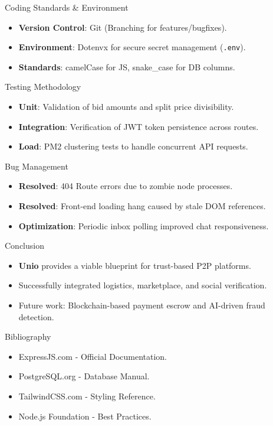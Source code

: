 \documentclass[10pt]{beamer}
\begin{document}
\begin{frame}{Coding Standards \& Environment}
    \begin{itemize}
        \item \textbf{Version Control}: Git (Branching for features/bugfixes).
        \item \textbf{Environment}: Dotenvx for secure secret management (\texttt{.env}).
        \item \textbf{Standards}: camelCase for JS, snake\_case for DB columns.
    \end{itemize}
\end{frame}

\begin{frame}{Testing Methodology}
    \begin{itemize}
        \item \textbf{Unit}: Validation of bid amounts and split price divisibility.
        \item \textbf{Integration}: Verification of JWT token persistence across routes.
        \item \textbf{Load}: PM2 clustering tests to handle concurrent API requests.
    \end{itemize}
\end{frame}

\begin{frame}{Bug Management}
    \begin{itemize}
        \item \textbf{Resolved}: 404 Route errors due to zombie node processes.
        \item \textbf{Resolved}: Front-end loading hang caused by stale DOM references.
        \item \textbf{Optimization}: Periodic inbox polling improved chat responsiveness.
    \end{itemize}
\end{frame}

\begin{frame}{Conclusion}
    \begin{itemize}
        \item \textbf{Unio} provides a viable blueprint for trust-based P2P platforms.
        \item Successfully integrated logistics, marketplace, and social verification.
        \item Future work: Blockchain-based payment escrow and AI-driven fraud detection.
    \end{itemize}
\end{frame}

\begin{frame}{Bibliography}
    \begin{itemize}
        \item [1] ExpressJS.com - Official Documentation.
        \item [2] PostgreSQL.org - Database Manual.
        \item [3] TailwindCSS.com - Styling Reference.
        \item [4] Node.js Foundation - Best Practices.
    \end{itemize}
\end{frame}
\end{document}
